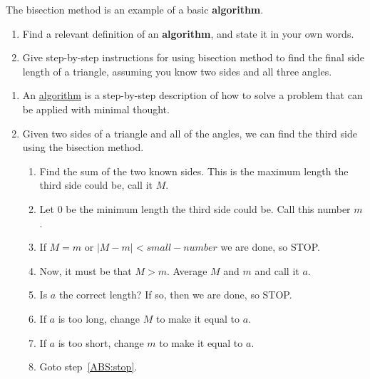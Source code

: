 \documentclass[handout,nooutcomes,noauthor]{ximera}
\begin{document}
\begin{question}
  The bisection method is an example of a basic \textbf{algorithm}.
  \begin{enumerate}
    \item Find a relevant definition of an \textbf{algorithm}, and state it in
      your own words.
    \item  Give step-by-step instructions for using bisection method to find
  the final side length of a triangle, assuming you know two sides and
  all three angles.
  \end{enumerate}
  \begin{freeResponse}
    \begin{enumerate}
    \item An \underline{algorithm} is a step-by-step description of how
      to solve a problem that can be applied with minimal thought.
    \item Given two sides of a triangle and all of the angles, we can
      find the third side using the bisection method.

    \begin{enumerate}
      \item Find the sum of the two known sides. This is the maximum
        length the third side could be, call it $M$.
      \item Let $0$ be the minimum length the third side could be. Call this number $m$.
      \item\label{ABS:stop} If $M=m$ or $|M-m|< small-number$ we are done, so STOP.
      \item Now, it must be that $M>m$. Average $M$ and $m$ and call it $a$.
      \item Is $a$ the correct length? If so, then we are done, so STOP.
      \item If $a$ is too long, change $M$ to make it equal to $a$.
      \item If $a$ is too short, change $m$ to make it equal to $a$.
      \item Goto step~\ref{ABS:stop}.
    \end{enumerate}
    \end{enumerate}
  \end{freeResponse}
\end{question}
\end{document}
